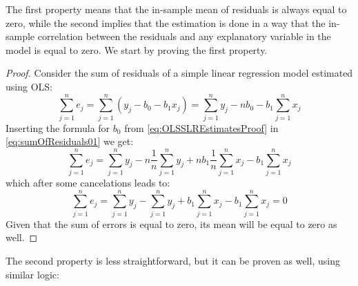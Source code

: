 \documentclass[
]{book}
\theoremstyle{definition}
\theoremstyle{definition}
\theoremstyle{definition}
\theoremstyle{definition}
\theoremstyle{remark}
\begin{document}
The first property means that the in-sample mean of residuals is always equal to zero, while the second implies that the estimation is done in a way that the in-sample correlation between the residuals and any explanatory variable in the model is equal to zero. We start by proving the first property.

\begin{proof}
Consider the sum of residuals of a simple linear regression model estimated using OLS:
\begin{equation}
    \sum_{j=1}^n e_j = \sum_{j=1}^n (y_j - b_0 - b_1 x_j) = \sum_{j=1}^n y_j - n b_0 - b_1  \sum_{j=1}^n x_j
    \label{eq:sumOfResiduals01}
\end{equation}
Inserting the formula for \(b_0\) from \eqref{eq:OLSSLREstimatesProof} in \eqref{eq:sumOfResiduals01} we get:
\begin{equation}
    \sum_{j=1}^n e_j = \sum_{j=1}^n y_j - n \frac{1}{n}\sum_{j=1}^n y_j + n b_1 \frac{1}{n}\sum_{j=1}^n x_j - b_1  \sum_{j=1}^n x_j
    \label{eq:sumOfResiduals02}
\end{equation}
which after some cancelations leads to:
\begin{equation}
    \sum_{j=1}^n e_j = \sum_{j=1}^n y_j - \sum_{j=1}^n y_j + b_1 \sum_{j=1}^n x_j - b_1 \sum_{j=1}^n x_j = 0
    \label{eq:sumOfResiduals03}
\end{equation}
Given that the sum of errors is equal to zero, its mean will be equal to zero as well.
\end{proof}

The second property is less straightforward, but it can be proven as well, using similar logic:
\end{document}
